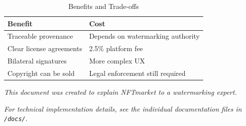 \documentclass[11pt,a4paper]{article}
\newcommand{\code}[1]{\texttt{#1}}
\begin{document}
\begin{table}[h]
\centering
\begin{tabular}{@{}L{6cm}L{6cm}@{}}
\toprule
\textbf{Benefit} & \textbf{Cost} \\
\midrule
Traceable provenance & Depends on watermarking authority \\
Clear license agreements & 2.5\% platform fee \\
Bilateral signatures & More complex UX \\
Copyright can be sold & Legal enforcement still required \\
\bottomrule
\end{tabular}
\caption{Benefits and Trade-offs}
\end{table}

\vfill

\begin{center}
\textit{This document was created to explain NFTmarket to a watermarking expert.}

\textit{For technical implementation details, see the individual documentation files in \code{/docs/}.}
\end{center}
\end{document}
